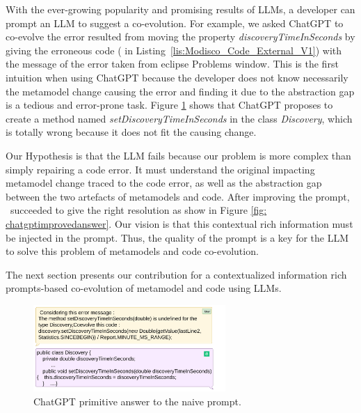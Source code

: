 With the ever-growing popularity and promising results of LLMs, a developer can prompt an LLM to suggest a co-evolution. 
For example, 
we asked ChatGPT to co-evolve the error resulted from moving the property \emph{discoveryTimeInSeconds} by giving the erroneous code ({\small{}} in Listing~\ref{lis:Modisco_Code_External_V1})  with the message of the error taken from eclipse Problems window. This is the first intuition when using ChatGPT because the developer does not know necessarily the metamodel change causing the error and finding it due to the abstraction gap is a tedious and error-prone task. Figure \ref{fig: chatgptanswer} shows that ChatGPT proposes to create a method named \emph{setDiscoveryTimeInSeconds} in the class \emph{Discovery}, which is totally wrong because it does not fit the causing change. 

Our Hypothesis is that the LLM fails because our problem is more complex than simply repairing a code error. It must understand the original impacting metamodel change traced to the code error, as well as the abstraction gap between the two artefacts of metamodels and code. After improving the prompt, \LLM~succeeded to give the right resolution as show in Figure \ref{fig: chatgptimprovedanswer}.
Our vision is that this contextual rich information must be injected in the prompt.
Thus, the quality of the prompt is a key for the LLM to solve this problem of metamodels and code co-evolution. %

%
The next section presents our contribution for a contextualized information rich prompts-based co-evolution of metamodel and code using LLMs.  


\begin{figure}[t]
	\centering
	\includegraphics[width=0.65\textwidth]{./pics/chapter3pics/chatgptprimitiveanswer.png}
	\caption{ChatGPT primitive answer to the naive prompt.}
	\label{fig: chatgptanswer}
\end{figure}

